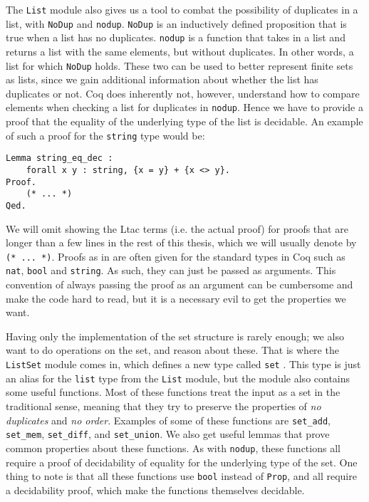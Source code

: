 The \lstinline{List} module also gives us a tool to combat the possibility of duplicates in a list,
with \lstinline{NoDup} and \lstinline{nodup}.
\lstinline{NoDup} is an inductively defined proposition that is true when a list has no duplicates.
\lstinline{nodup} is a function that takes in a list and returns a list with the same elements, but without duplicates.
In other words, a list for which \lstinline{NoDup} holds.
These two can be used to better represent finite sets as lists, since
we gain additional information about whether the list has duplicates or not.
Coq does inherently not, however, understand how to compare elements when checking a list for duplicates in \lstinline{nodup}.
Hence we have to provide a proof that the equality of the underlying type of the list is decidable.
An example of such a proof for the \lstinline{string} type would be:

\begin{minipage}{\linewidth}
\begin{lstlisting}[language=Coq, label={lst:string_eq_dec}, caption={Decidability proof for string equality in Coq}]
Lemma string_eq_dec :
    forall x y : string, {x = y} + {x <> y}.
Proof.
    (* ... *)
Qed.
\end{lstlisting}
\end{minipage}

We will omit showing the Ltac terms (i.e. the actual proof) for proofs that are longer than a few lines in the rest of this thesis,
which we will usually denote by \lstinline{(* ... *)}.
Proofs as in  are often given for the standard types in Coq such as \lstinline{nat},
\lstinline{bool} and \lstinline{string}.
As such, they can just be passed as arguments.
This convention of always passing the proof as an argument can be cumbersome and make the code hard to read,
but it is a necessary evil to get the properties we want.

Having only the implementation of the set structure is rarely enough; we also want to do operations on the set, and reason about these.
That is where the \lstinline{ListSet} module comes in, which defines a new type called \lstinline{set} \cite{coqlistset}.
This type is just an alias for the \lstinline{list} type from the \lstinline{List} module,
but the module also contains some useful functions.
Most of these functions treat the input as a set in the traditional sense,
meaning that they try to preserve the properties of \emph{no duplicates} and \emph{no order}.
Examples of some of these functions are \lstinline{set_add}, \lstinline{set_mem},
\lstinline{set_diff}, and \lstinline{set_union}.
We also get useful lemmas that prove common properties about these functions.
As with \lstinline{nodup}, these functions all require a proof of decidability of equality for the underlying type of the set.
One thing to note is that all these functions use \lstinline{bool} instead of
\lstinline{Prop}, and all require a decidability proof, which make the functions themselves decidable.

